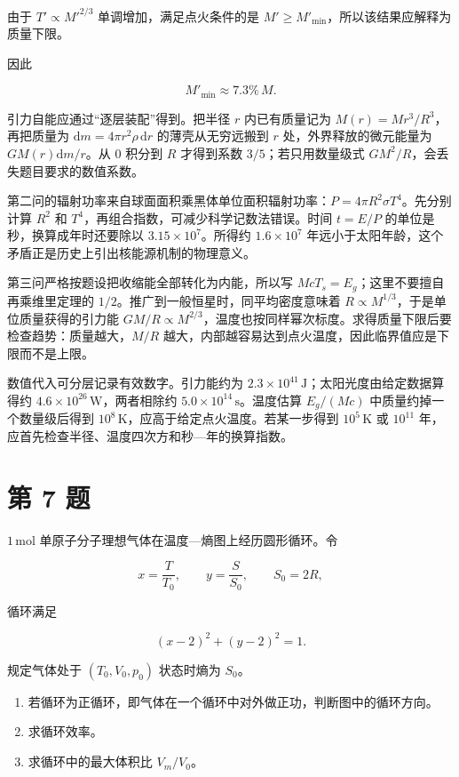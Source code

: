 \documentclass[12pt,a4paper,UTF8]{ctexart}
\newcommand{\tightlist}{\setlength{\itemsep}{0pt}\setlength{\parskip}{0pt}}
\begin{document}
由于 \(T'\propto M'^{2/3}\) 单调增加，满足点火条件的是
\(M'\geq M'_{\min}\)，所以该结果应解释为质量下限。

因此

\[\boxed{M'_{\min}\approx7.3\%\,M}. \tag{17}\]

引力自能应通过``逐层装配''得到。把半径 \(r\) 内已有质量记为
\(M(r)=M r^3/R^3\)，再把质量为 \(\mathrm dm=4\pi r^2\rho\,\mathrm dr\)
的薄壳从无穷远搬到 \(r\) 处，外界释放的微元能量为
\(G M(r)\mathrm dm/r\)。从 \(0\) 积分到 \(R\) 才得到系数
\(3/5\)；若只用数量级式 \(GM^2/R\)，会丢失题目要求的数值系数。

第二问的辐射功率来自球面面积乘黑体单位面积辐射功率：\(P=4\pi R^2\sigma T^4\)。先分别计算
\(R^2\) 和 \(T^4\)，再组合指数，可减少科学记数法错误。时间 \(t=E/P\)
的单位是秒，换算成年时还要除以 \(3.15\times10^7\)。所得约
\(1.6\times10^7\)
年远小于太阳年龄，这个矛盾正是历史上引出核能源机制的物理意义。

第三问严格按题设把收缩能全部转化为内能，所以写
\(McT_s=E_g\)；这里不要擅自再乘维里定理的
\(1/2\)。推广到一般恒星时，同平均密度意味着
\(R\propto M^{1/3}\)，于是单位质量获得的引力能
\(GM/R\propto M^{2/3}\)，温度也按同样幂次标度。求得质量下限后要检查趋势：质量越大，\(M/R\)
越大，内部越容易达到点火温度，因此临界值应是下限而不是上限。

数值代入可分层记录有效数字。引力能约为
\(2.3\times10^{41}\,\mathrm J\)；太阳光度由给定数据算得约
\(4.6\times10^{26}\,\mathrm W\)，两者相除约
\(5.0\times10^{14}\,\mathrm s\)。温度估算 \(E_g/(Mc)\)
中质量约掉一个数量级后得到
\(10^8\,\mathrm K\)，应高于给定点火温度。若某一步得到
\(10^5\,\mathrm K\) 或 \(10^{11}\)
年，应首先检查半径、温度四次方和秒---年的换算指数。

\newpage

\section{第 7 题}\label{ux7b2c-7-ux9898}

\(1\,\mathrm{mol}\) 单原子分子理想气体在温度---熵图上经历圆形循环。令

\[x=\frac{T}{T_0},\qquad y=\frac{S}{S_0},\qquad S_0=2R,\]

循环满足

\[(x-2)^2+(y-2)^2=1.\]

规定气体处于 \((T_0,V_0,p_0)\) 状态时熵为 \(S_0\)。

\begin{enumerate}
\def\labelenumi{\arabic{enumi}.}
\tightlist
\item
  若循环为正循环，即气体在一个循环中对外做正功，判断图中的循环方向。
\item
  求循环效率。
\item
  求循环中的最大体积比 \(V_m/V_0\)。
\end{enumerate}
\end{document}
